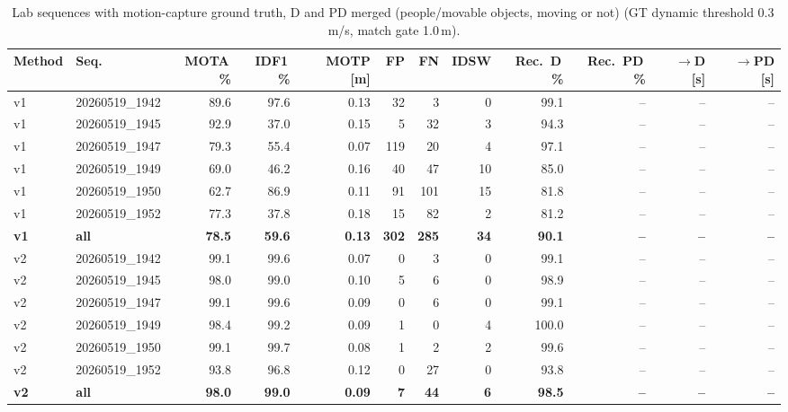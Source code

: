\begin{table}[t]
\centering
\caption{Lab sequences with motion-capture ground truth, D and PD merged (people/movable objects, moving or not) (GT dynamic threshold 0.3\,m/s, match gate 1.0\,m).}
\label{tab:own_r9b_merged}
\setlength{\tabcolsep}{3pt}
\begin{tabular}{llrrrrrrrrrr}
\toprule
Method & Seq. & MOTA\,\% & IDF1\,\% & MOTP [m] & FP & FN & IDSW & Rec.\ D\,\% & Rec.\ PD\,\% & $\to$D [s] & $\to$PD [s] \\
\midrule
v1 & 20260519\_1942 & 89.6 & 97.6 & 0.13 & 32 & 3 & 0 & 99.1 & -- & -- & -- \\
v1 & 20260519\_1945 & 92.9 & 37.0 & 0.15 & 5 & 32 & 3 & 94.3 & -- & -- & -- \\
v1 & 20260519\_1947 & 79.3 & 55.4 & 0.07 & 119 & 20 & 4 & 97.1 & -- & -- & -- \\
v1 & 20260519\_1949 & 69.0 & 46.2 & 0.16 & 40 & 47 & 10 & 85.0 & -- & -- & -- \\
v1 & 20260519\_1950 & 62.7 & 86.9 & 0.11 & 91 & 101 & 15 & 81.8 & -- & -- & -- \\
v1 & 20260519\_1952 & 77.3 & 37.8 & 0.18 & 15 & 82 & 2 & 81.2 & -- & -- & -- \\
\textbf{v1} & \textbf{all} & \textbf{78.5} & \textbf{59.6} & \textbf{0.13} & \textbf{302} & \textbf{285} & \textbf{34} & \textbf{90.1} & \textbf{--} & \textbf{--} & \textbf{--} \\
\midrule
v2 & 20260519\_1942 & 99.1 & 99.6 & 0.07 & 0 & 3 & 0 & 99.1 & -- & -- & -- \\
v2 & 20260519\_1945 & 98.0 & 99.0 & 0.10 & 5 & 6 & 0 & 98.9 & -- & -- & -- \\
v2 & 20260519\_1947 & 99.1 & 99.6 & 0.09 & 0 & 6 & 0 & 99.1 & -- & -- & -- \\
v2 & 20260519\_1949 & 98.4 & 99.2 & 0.09 & 1 & 0 & 4 & 100.0 & -- & -- & -- \\
v2 & 20260519\_1950 & 99.1 & 99.7 & 0.08 & 1 & 2 & 2 & 99.6 & -- & -- & -- \\
v2 & 20260519\_1952 & 93.8 & 96.8 & 0.12 & 0 & 27 & 0 & 93.8 & -- & -- & -- \\
\textbf{v2} & \textbf{all} & \textbf{98.0} & \textbf{99.0} & \textbf{0.09} & \textbf{7} & \textbf{44} & \textbf{6} & \textbf{98.5} & \textbf{--} & \textbf{--} & \textbf{--} \\
\bottomrule
\end{tabular}
\end{table}
